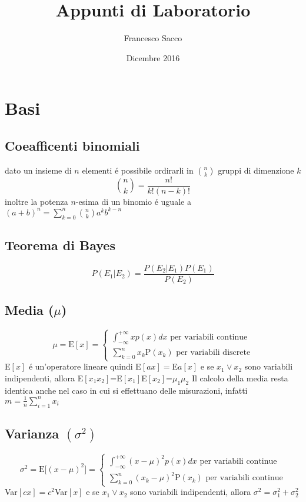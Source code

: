 \documentclass{exam}
\date{Dicembre 2016}
\title{Appunti di Laboratorio}
\author{Francesco Sacco}
\begin{document}
  \section{Basi}
    \subsection{Coeafficenti binomiali}
      dato un insieme di $n$ elementi \'e possibile ordirarli in 
      $\binom{n}{k}$ gruppi di dimenzione $k$
      \[ \binom{n}{k}=\frac{n!}{k!(n-k)!} \]
      inoltre la potenza $n$-esima di un binomio \'e uguale a 
      \(\displaystyle(a+b)^n=\sum_{k=0}^n \binom{n}{k}a^k b^{k-n} \)
      
    \subsection{Teorema di Bayes}
      \[P(E_{1}|E_{2})=\frac{P(E_{2}|E_{1})P(E_{1})}{P(E_{2})} \]
      
    \subsection{Media ($\mu$)}
      \begin{displaymath}
        \mu=\textrm{E}[x]=\begin{cases}
            \displaystyle \int_{-\infty}^{+\infty}xp(x)dx \textrm{ per variabili continue}\\
            \displaystyle \sum_{k=0}^{n}x_{k}\textrm{P}(x_{k})
            \textrm{ per variabili discrete}
          \end{cases}
      \end{displaymath}
      E$[x]$ \'e un'operatore lineare quindi E$[ax]=$E$a[x]$
      e se $x_{1} \lor x_{2}$ sono variabili indipendenti, allora
      E$[x_{1}x_{2}]$=E$[x_{1}]$E$[x_{2}]$=$\mu_{1}\mu_{2}$
      Il calcolo della media resta identica anche nel caso in cui si effettuano delle misurazioni, infatti \(\displaystyle m=\frac{1}{n}\sum_{i=1}^{n}x_{i}\)
       
    \subsection{Varianza $(\sigma^2)$}
      \[
        \sigma^2=\textrm{E}\Big[(x-\mu)^2\Big]=\begin{cases}
            \displaystyle \int_{-\infty}^{+\infty}(x-\mu)^2 p(x)dx 
            \textrm{ per variabili continue}\\
            \displaystyle \sum_{k=0}^{n}(x_{k}-\mu)^2\textrm{P}(x_{k})
            \textrm { per variabili continue}
          \end{cases}
      \]
      Var$[cx]=c^2$Var$[x]$ e se $x_{1} \lor x_{2}$ sono variabili indipendenti, allora
      $\sigma^2=\sigma_{1}^2+\sigma_{2}^2$
\end{document}
